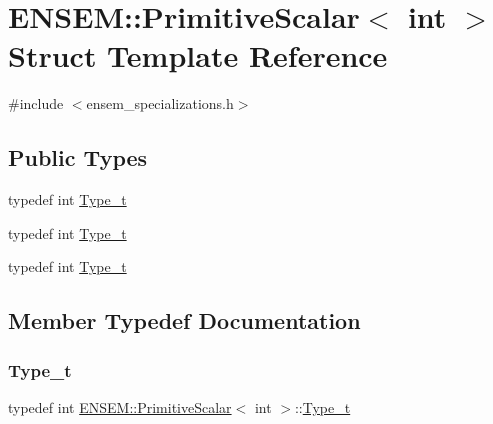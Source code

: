 \hypertarget{structENSEM_1_1PrimitiveScalar_3_01int_01_4}{}\section{E\+N\+S\+EM\+:\+:Primitive\+Scalar$<$ int $>$ Struct Template Reference}
\label{structENSEM_1_1PrimitiveScalar_3_01int_01_4}


{\ttfamily \#include $<$ensem\+\_\+specializations.\+h$>$}

\subsection*{Public Types}
\begin{DoxyCompactItemize}
\item 
typedef int \mbox{\hyperlink{structENSEM_1_1PrimitiveScalar_3_01int_01_4_add9ad08e498afda6942432a1df83407b}{Type\+\_\+t}}
\item 
typedef int \mbox{\hyperlink{structENSEM_1_1PrimitiveScalar_3_01int_01_4_add9ad08e498afda6942432a1df83407b}{Type\+\_\+t}}
\item 
typedef int \mbox{\hyperlink{structENSEM_1_1PrimitiveScalar_3_01int_01_4_add9ad08e498afda6942432a1df83407b}{Type\+\_\+t}}
\end{DoxyCompactItemize}


\subsection{Member Typedef Documentation}
\mbox{\label{structENSEM_1_1PrimitiveScalar_3_01int_01_4_add9ad08e498afda6942432a1df83407b}} 
\subsubsection{\texorpdfstring{Type\_t}{Type\_t}\hspace{0.1cm}{\footnotesize\ttfamily [1/3]}}
{\footnotesize\ttfamily typedef int \mbox{\hyperlink{structENSEM_1_1PrimitiveScalar}{E\+N\+S\+E\+M\+::\+Primitive\+Scalar}}$<$ int $>$\+::\mbox{\hyperlink{structENSEM_1_1PrimitiveScalar_3_01int_01_4_add9ad08e498afda6942432a1df83407b}{Type\+\_\+t}}}

